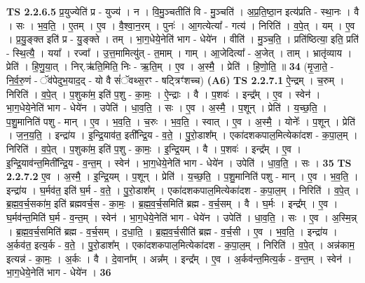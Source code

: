 \documentclass[17pt]{extarticle}
\begin{document}
                  \newline
                                \textbf{ TS 2.2.6.5} \newline
                  प्र॒युज्येति॑ प्र - युज्य॑ । न । वि॒मु॒ञ्चतीति॑ वि - मु॒ञ्चति॑ । अ॒प्र॒ति॒ष्ठा॒न इत्य॑प्रति - स्था॒नः । वै । सः । भ॒व॒ति॒ । ए॒तम् । ए॒व । वै॒श्वा॒न॒रम् । पुनः॑ । आ॒गत्येत्या᳚ - गत्य॑ । निरिति॑ । व॒पे॒त् । यम् । ए॒व । प्र॒यु॒ङ्क्त इति॑ प्र - यु॒ङ्क्ते । तम् । भा॒ग॒धेये॒नेति॑ भाग - धेये॑न । वीति॑ । मु॒ञ्च॒ति॒ । प्रति॑ष्ठित्या॒ इति॒ प्रति॑ - स्थि॒त्यै॒ । यया᳚ । रज्वा᳚ । उ॒त्त॒मामित्यु॑त् - त॒माम् । गाम् । आ॒जेदित्या᳚ - अ॒जेत् । ताम् । भ्रातृ॑व्याय । प्रेति॑ । हि॒णु॒या॒त् । निर्.ऋ॑ति॒मिति॒ निः - ऋ॒ति॒म् । ए॒व । अ॒स्मै॒ । प्रेति॑ । हि॒णो॒ति॒ ॥ \textbf{  34 } \newline
                  \newline
                      (मृ॒जा॒ते॒ - नि॒र्व॒रु॒णं - ॅव॑पेदुभ॒याद॒द् - यो वै सं॑ॅवथ्स॒रꣳ - षट्त्रिꣳ॑शच्च)  \textbf{(A6)} \newline \newline
                                \textbf{ TS 2.2.7.1} \newline
                  ऐ॒न्द्रम् । च॒रुम् । निरिति॑ । व॒पे॒त् । प॒शुका॑म॒ इति॑ प॒शु - का॒मः॒ । ऐ॒न्द्राः । वै । प॒शवः॑ । इन्द्र᳚म् । ए॒व । स्वेन॑ । भा॒ग॒धेये॒नेति॑ भाग - धेये॑न । उपेति॑ । धा॒व॒ति॒ । सः । ए॒व । अ॒स्मै॒ । प॒शून् । प्रेति॑ । य॒च्छ॒ति॒ । प॒शु॒मानिति॑ पशु - मान् । ए॒व । भ॒व॒ति॒ । च॒रुः । भ॒व॒ति॒ । स्वात् । ए॒व । अ॒स्मै॒ । योनेः᳚ । प॒शून् । प्रेति॑ । ज॒न॒य॒ति॒ । इन्द्रा॑य । इ॒न्द्रि॒याव॑त॒ इती᳚न्द्रि॒य - व॒ते॒ । पु॒रो॒डाश᳚म् । एका॑दशकपाल॒मित्येका॑दश - क॒पा॒ल॒म् । निरिति॑ । व॒पे॒त् । प॒शुका॑म॒ इति॑ प॒शु - का॒मः॒ । इ॒न्द्रि॒यम् । वै । प॒शवः॑ । इन्द्र᳚म् । ए॒व । इ॒न्द्रि॒याव॑न्त॒मिती᳚न्द्रि॒य - व॒न्त॒म् । स्वेन॑ । भा॒ग॒धेये॒नेति॑ भाग - धेये॑न । उपेति॑ । धा॒व॒ति॒ । सः । \textbf{  35} \newline
                  \newline
                                \textbf{ TS 2.2.7.2} \newline
                  ए॒व । अ॒स्मै॒ । इ॒न्द्रि॒यम् । प॒शून् । प्रेति॑ । य॒च्छ॒ति॒ । प॒शु॒मानिति॑ पशु - मान् । ए॒व । भ॒व॒ति॒ । इन्द्रा॑य । घ॒र्मव॑त॒ इति॑ घ॒र्म - व॒ते॒ । पु॒रो॒डाश᳚म् । एका॑दशकपाल॒मित्येका॑दश - क॒पा॒ल॒म् । निरिति॑ । व॒पे॒त् । ब्र॒ह्म॒व॒र्च॒सका॑म॒ इति॑ ब्रह्मवर्च॒स - का॒मः॒ । ब्र॒ह्म॒व॒र्च॒समिति॑ ब्रह्म - व॒र्च॒सम् । वै । घ॒र्मः । इन्द्र᳚म् । ए॒व । घ॒र्मव॑न्त॒मिति॑ घ॒र्म - व॒न्त॒म् । स्वेन॑ । भा॒ग॒धेये॒नेति॑ भाग - धेये॑न । उपेति॑ । धा॒व॒ति॒ । सः । ए॒व । अ॒स्मि॒न्न् । ब्र॒ह्म॒व॒र्च॒समिति॑ ब्रह्म - व॒र्च॒सम् । द॒धा॒ति॒ । ब्र॒ह्म॒व॒र्च॒सीति॑ ब्रह्म - व॒र्च॒सी । ए॒व । भ॒व॒ति॒ । इन्द्रा॑य । अ॒र्कव॑त॒ इत्य॒र्क - व॒ते॒ । पु॒रो॒डाश᳚म् । एका॑दशकपाल॒मित्येका॑दश - क॒पा॒ल॒म् । निरिति॑ । व॒पे॒त् । अन्न॑काम॒ इत्यन्न॑ - का॒मः॒ । अ॒र्कः । वै । दे॒वाना᳚म् । अन्न᳚म् । इन्द्र᳚म् । ए॒व । अ॒र्कव॑न्त॒मित्य॒र्क - व॒न्त॒म् । स्वेन॑ । भा॒ग॒धेये॒नेति॑ भाग - धेये॑न । \textbf{  36} \newline
\end{document}
